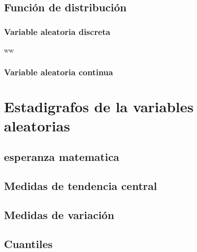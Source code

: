 \documentclass[10pt,]{krantz}
\theoremstyle{definition}
\theoremstyle{definition}
\theoremstyle{definition}
\theoremstyle{remark}
\let\BeginKnitrBlock\begin \let\EndKnitrBlock\end
\begin{document}
\hypertarget{funciuxf3n-de-distribuciuxf3n}{%
\section{Función de distribución}\label{funciuxf3n-de-distribuciuxf3n}}

\hypertarget{variable-aleatoria-discreta-1}{%
\subsection{Variable aleatoria discreta}\label{variable-aleatoria-discreta-1}}

\BeginKnitrBlock{definition}[]
\protect\hypertarget{def:unnamed-chunk-12}{}{\label{def:unnamed-chunk-12} \iffalse () \fi{} }ww
\EndKnitrBlock{definition}

\hypertarget{variable-aleatoria-continua-1}{%
\subsection{Variable aleatoria continua}\label{variable-aleatoria-continua-1}}

\hypertarget{estadigrafos-de-la-variables-aleatorias}{%
\chapter{Estadigrafos de la variables aleatorias}\label{estadigrafos-de-la-variables-aleatorias}}

\hypertarget{esperanza-matematica}{%
\section{esperanza matematica}\label{esperanza-matematica}}

\hypertarget{medidas-de-tendencia-central-1}{%
\section{Medidas de tendencia central}\label{medidas-de-tendencia-central-1}}

\hypertarget{medidas-de-variaciuxf3n}{%
\section{Medidas de variación}\label{medidas-de-variaciuxf3n}}

\hypertarget{cuantiles}{%
\section{Cuantiles}\label{cuantiles}}
\end{document}
